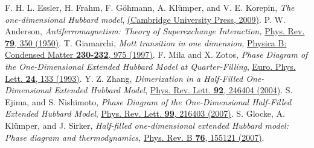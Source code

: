 \documentclass[aps,prl,showpacs,twocolumn,superscriptaddress]{revtex4-2}
\begin{document}
\begin{thebibliography}{99}
F. H. L. Essler, H. Frahm, F. G\"ohmann, A. Kl\"umper, and V. E. Korepin,
{\it The one-dimensional Hubbard model}, \href{https://doi.org/10.1017/CBO9780511534843}{(Cambridge University Press, 2009)}.
P. W. Anderson,
{\it Antiferromagnetism: Theory of Superexchange Interaction,}
\href{https://journals.aps.org/pr/abstract/10.1103/PhysRev.79.350}{Phys. Rev. {\bf 79}, 350 (1950)}.
T. Giamarchi,
{\it Mott transition in one dimension},
\href{https://doi.org/10.1016/S0921-4526(96)00768-5}{Physica B: Condensed Matter {\bf 230-232},  975 (1997)}.
F. Mila and X. Zotos,
{\it Phase Diagram of the One-Dimensional Extended Hubbard Model at Quarter-Filling},
\href{https://iopscience.iop.org/article/10.1209/0295-5075/24/2/010}{Euro. Phys. Lett. {\bf 24}, 133 (1993)}.
Y. Z. Zhang,
{\it Dimerization in a Half-Filled One-Dimensional Extended Hubbard Model},
\href{https://journals.aps.org/prl/abstract/10.1103/PhysRevLett.92.246404}{Phys. Rev. Lett. {\bf 92}, 246404 (2004)}.
S. Ejima, and S. Nishimoto,
{\it Phase Diagram of the One-Dimensional Half-Filled Extended Hubbard Model},
\href{https://journals.aps.org/prl/abstract/10.1103/PhysRevLett.99.216403}{Phys. Rev. Lett. {\bf 99}, 216403 (2007)}.
S. Glocke, A. Kl\"{u}mper, and J. Sirker,
{\it Half-filled one-dimensional extended Hubbard model: Phase diagram and thermodynamics,}
\href{https://journals.aps.org/prb/abstract/10.1103/PhysRevB.76.155121}{Phys. Rev. B {\bf 76}, 155121 (2007)}.


\end{thebibliography}
\end{document}
